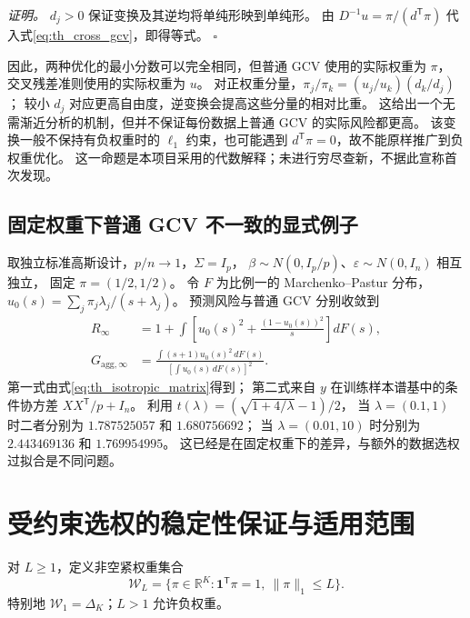 \documentclass[UTF8,fontset=fandol,11pt,a4paper]{ctexart}
\begin{document}
\textit{证明。}
$d_j>0$ 保证变换及其逆均将单纯形映到单纯形。
由 $D^{-1}u=\pi/(d^{\mathsf T}\pi)$ 代入式\eqref{eq:th_cross_gcv}，即得等式。
\hfill$\square$

因此，两种优化的最小分数可以完全相同，但普通 GCV 使用的实际权重为 $\pi$，
交叉残差准则使用的实际权重为 $u$。
对正权重分量，$\pi_j/\pi_k=(u_j/u_k)(d_k/d_j)$；
较小 $d_j$ 对应更高自由度，逆变换会提高这些分量的相对比重。
这给出一个无需渐近分析的机制，但并不保证每份数据上普通 GCV 的实际风险都更高。
该变换一般不保持有负权重时的 $\ell_1$ 约束，也可能遇到 $d^{\mathsf T}\pi=0$，故不能原样推广到负权重优化。
这一命题是本项目采用的代数解释；未进行穷尽查新，不据此宣称首次发现。

\subsection{固定权重下普通 GCV 不一致的显式例子}
取独立标准高斯设计，$p/n\to1$，$\Sigma=I_p$，
$\beta\sim N(0,I_p/p)$、$\varepsilon\sim N(0,I_n)$ 相互独立，
固定 $\pi=(1/2,1/2)$。
令 $F$ 为比例一的 Marchenko--Pastur 分布，
$u_0(s)=\sum_j\pi_j\lambda_j/(s+\lambda_j)$。
预测风险与普通 GCV 分别收敛到
\begin{align}
 R_\infty
 &=1+\int\left[u_0(s)^2+\frac{(1-u_0(s))^2}{s}\right]dF(s),\label{eq:th_mp_risk}\\
 G_{\mathrm{agg},\infty}
 &=\frac{\int(s+1)u_0(s)^2\,dF(s)}{\left[\int u_0(s)\,dF(s)\right]^2}.
 \label{eq:th_mp_gcv}
\end{align}
第一式由式\eqref{eq:th_isotropic_matrix}得到；
第二式来自 $y$ 在训练样本谱基中的条件协方差 $XX^{\mathsf T}/p+I_n$。
利用 $t(\lambda)=(\sqrt{1+4/\lambda}-1)/2$，
当 $\lambda=(0.1,1)$ 时二者分别为 $1.787525057$ 和 $1.680756692$；
当 $\lambda=(0.01,10)$ 时分别为 $2.443469136$ 和 $1.769954995$。
这已经是在固定权重下的差异，与额外的数据选权过拟合是不同问题。

\section{受约束选权的稳定性保证与适用范围}\label{sec:theory_stability}
对 $L\ge1$，定义非空紧权重集合
\begin{equation}\label{eq:th_weight_class}
 \mathcal W_L=\{\pi\in\mathbb R^K:\boldsymbol1^{\mathsf T}\pi=1,\ \lVert\pi\rVert_1\le L\}.
\end{equation}
特别地 $\mathcal W_1=\Delta_K$；$L>1$ 允许负权重。
\end{document}
